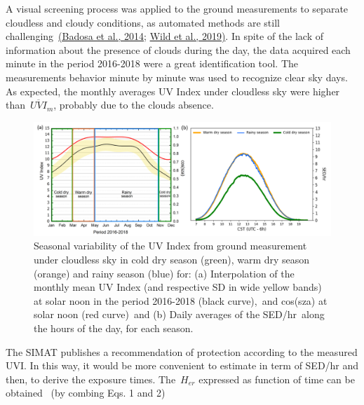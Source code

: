 \documentclass[10pt]{article}
\begin{document}
A visual screening process was applied to the ground measurements to
separate cloudless and cloudy conditions, as automated methods are still
challenging~\hyperref[csl:67]{(Badosa et al., 2014}; \hyperref[csl:68]{Wild et al., 2019)}. In spite of the lack of information
about the presence of clouds during the day, the data acquired each
minute in the period 2016-2018 were a great identification tool. The
measurements behavior minute by minute was used to recognize clear sky
days. As expected, the monthly averages UV Index under cloudless sky
were higher than~\(\overline{UVI}_m\), probably due to the clouds absence.
\begin{figure}[H]
\begin{center}
\includegraphics[width=0.98\columnwidth]{season_graphics}
\caption{{Seasonal variability of the UV Index from ground measurement under
cloudless sky in cold dry season (green), warm dry season (orange) and
rainy season (blue) for: (a) Interpolation of the monthly mean UV Index
(and respective SD in wide yellow bands) at solar noon in the period
2016-2018 (black curve),~and cos(sza) at solar noon (red curve)~and (b)
Daily averages of the SED/hr~along the hours of the day, for each
season.~
{\label{590688}}%
}}
\end{center}
\end{figure}

The SIMAT publishes a recommendation of protection according to the
measured UVI. In this way, it would be more convenient to estimate in
term of SED/hr and then, to derive the exposure times.
The~\(H_{er}\) expressed as function of time can be obtained~
(by combing Eqs. 1 and 2)
\end{document}
